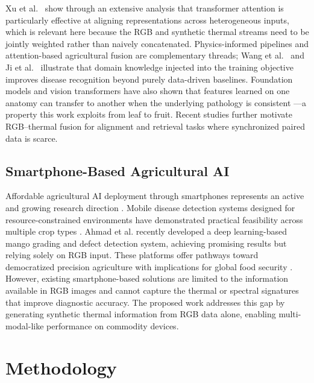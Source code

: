 \documentclass[utf8]{FrontiersinHarvard} %
\begin{document}
Xu et al.\ \cite{xu2023} show through an extensive analysis that transformer attention is particularly effective at aligning representations across heterogeneous inputs, which is relevant here because the RGB and synthetic thermal streams need to be jointly weighted rather than naively concatenated. Physics-informed pipelines \cite{karniadakis2021} and attention-based agricultural fusion \cite{niu2021,guo2022} are complementary threads; Wang et al.\ \cite{wang2022_synthetic} and Ji et al.\ \cite{ji2023} illustrate that domain knowledge injected into the training objective improves disease recognition beyond purely data-driven baselines. Foundation models and vision transformers have also shown that features learned on one anatomy can transfer to another when the underlying pathology is consistent \cite{vaswani2017,dosovitskiy2021}---a property this work exploits from leaf to fruit. Recent studies \cite{xiao2025thermalgen,tulu2026rgb} further motivate RGB--thermal fusion for alignment and retrieval tasks where synchronized paired data is scarce.

\subsection{Smartphone-Based Agricultural AI}
Affordable agricultural AI deployment through smartphones represents an active and growing research direction \cite{pongnumkul2015,coulibaly2022}. Mobile disease detection systems designed for resource-constrained environments have demonstrated practical feasibility across multiple crop types \cite{li2020,picon2022}. Ahmad et al. \cite{ahmad2023} recently developed a deep learning-based mango grading and defect detection system, achieving promising results but relying solely on RGB input. These platforms offer pathways toward democratized precision agriculture with implications for global food security \cite{liu2020_yolo}. However, existing smartphone-based solutions are limited to the information available in RGB images and cannot capture the thermal or spectral signatures that improve diagnostic accuracy. The proposed work addresses this gap by generating synthetic thermal information from RGB data alone, enabling multi-modal-like performance on commodity devices.

\section{Methodology}
\end{document}
